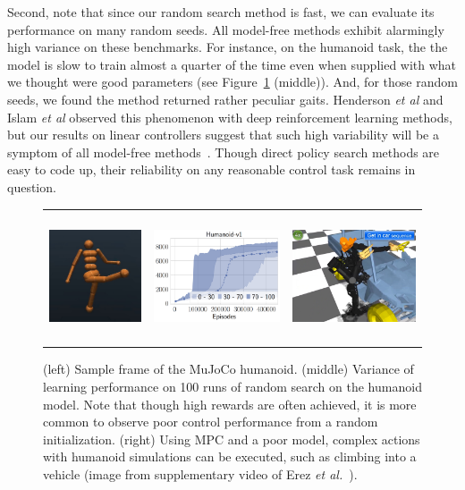 \documentclass[11pt]{article}
\numberwithin{equation}{section}
\begin{document}
Second, note that since our random search method is fast, we can evaluate its performance on many random seeds. All model-free methods exhibit alarmingly high variance on these benchmarks. For instance, on the humanoid task, the the model is slow to train almost a quarter of the time even when supplied with what we thought were good parameters (see Figure~\ref{fig:mujoco} (middle)). And, for those random seeds, we found the method returned rather peculiar gaits. Henderson \emph{et al} and Islam \emph{et al} observed this phenomenon with deep reinforcement learning methods, but our results on linear controllers suggest that such high variability will be a symptom of all model-free methods~\cite{henderson2017deep,islam2017reproducibility}. Though direct policy search methods are easy to code up, their reliability on any reasonable control task remains in question.

\begin{figure}[ht]
 \centering
 \begin{tabular}{ccc}
	      \includegraphics[height=1.5in]{figs/kickup.jpg} &
	      \includegraphics[height=1.5in]{figs/humanoid_100seeds_med.png} &
	      \includegraphics[height=1.5in]{figs/get_in_car.jpg} 
\end{tabular} 
  \caption{
(left) Sample frame of the MuJoCo humanoid. (middle) Variance of learning performance on 100 runs of random search on the humanoid model. Note that though high rewards are often achieved, it is more common to observe poor control performance from a random initialization. (right) Using MPC and a poor model, complex actions with humanoid simulations can be executed, such as climbing into a vehicle (image from supplementary video of Erez \emph{et al.}~\cite{erez2013integrated}).}\label{fig:mujoco}
\end{figure}
\end{document}
